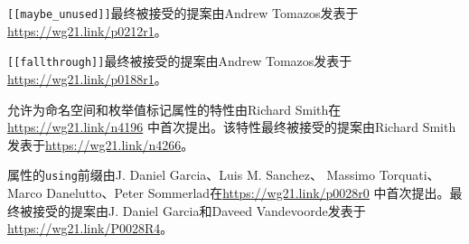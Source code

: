 \texttt{[[maybe\_unused]]}最终被接受的提案由Andrew Tomazos发表于
\url{https://wg21.link/p0212r1}。

\texttt{[[fallthrough]]}最终被接受的提案由Andrew Tomazos发表于
\url{https://wg21.link/p0188r1}。

允许为命名空间和枚举值标记属性的特性由Richard Smith在\url{https://wg21.link/n4196}
中首次提出。该特性最终被接受的提案由Richard Smith发表于\url{https://wg21.link/n4266}。

属性的\texttt{using}前缀由J. Daniel Garcia、Luis M. Sanchez、
Massimo Torquati、Marco Danelutto、Peter Sommerlad在\url{https://wg21.link/p0028r0}
中首次提出。最终被接受的提案由J. Daniel Garcia和Daveed Vandevoorde发表于
\url{https://wg21.link/P0028R4}。

\setcounter{footnote}{0}